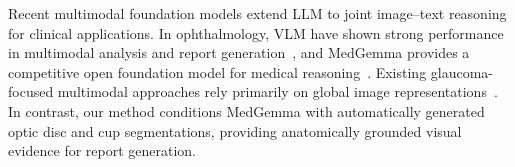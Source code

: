 \documentclass[runningheads]{llncs}
\begin{document}




Recent multimodal foundation models extend \gls{LLM} to joint image--text reasoning for clinical applications. In ophthalmology, \gls{VLM} have shown strong performance in multimodal analysis and report generation~\cite{shi2025eyecare}, and MedGemma provides a competitive open foundation model for medical reasoning~\cite{sellergren2025medgemma}. Existing glaucoma-focused multimodal approaches rely primarily on global image representations~\cite{jalili2025glaucoma}. In contrast, our method conditions MedGemma with automatically generated optic disc and cup segmentations, providing anatomically grounded visual evidence for report generation.
\end{document}
